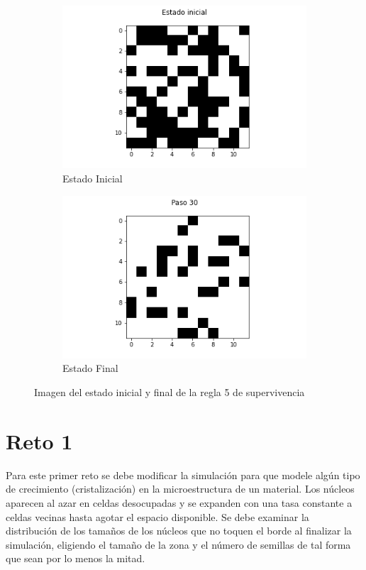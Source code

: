 \documentclass{article}
\begin{document}
\begin{figure}[H]
\centering
\begin{subfigure}[b]{0.45\linewidth}
\includegraphics[width=\linewidth]{p2_r5_t00_p.png}
\caption{Estado Inicial}
\end{subfigure}
\begin{subfigure}[b]{0.45\linewidth}
\includegraphics[width=\linewidth]{p2_r5_t30_p.png}
\caption{Estado Final}
\end{subfigure}
\caption{Imagen del estado inicial y final de la regla 5 de supervivencia}
\label{fig:westminster}
\end{figure}


\section{Reto 1}
Para este primer reto se debe modificar la simulación para que modele algún tipo de crecimiento (cristalización) en la microestructura de un material. Los núcleos aparecen al azar en celdas desocupadas y se expanden con una tasa constante a celdas vecinas hasta agotar el espacio disponible. Se debe examinar la distribución de los tamaños de los núcleos que no toquen el borde al finalizar la simulación, eligiendo el tamaño de la zona y el número de semillas de tal forma que sean por lo menos la mitad.
\end{document}
